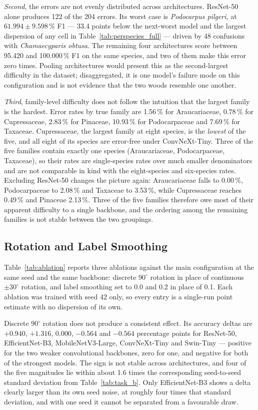 \textit{Second}, the errors are not evenly distributed across
architectures. ResNet-50 alone produces 122 of the 204 errors. Its worst
case is \textit{Podocarpus pilgeri}, at $61.994 \pm 9.598$\,\% F1 ---
33.4 points below the next-worst model and the largest dispersion of any
cell in Table~\ref{tab:perspecies_full} --- driven by 48 confusions with
\textit{Chamaecyparis obtusa}. The remaining four architectures score
between 95.420 and 100.000\,\% F1 on the same species, and two of them make
this error zero times. Pooling architectures would present this as the
second-largest difficulty in the dataset; disaggregated, it is one model's
failure mode on this configuration and is not evidence that the two woods
resemble one another.

\textit{Third}, family-level difficulty does not follow the intuition that
the largest family is the hardest. Error rates by true family are
1.56\,\% for Araucariaceae, 0.78\,\% for Cupressaceae, 2.83\,\% for
Pinaceae, 10.93\,\% for Podocarpaceae and 7.69\,\% for Taxaceae.
Cupressaceae, the largest family at eight species, is the \emph{lowest} of
the five, and all eight of its species are error-free under ConvNeXt-Tiny.
Three of the five families contain exactly one species (Araucariaceae,
Podocarpaceae, Taxaceae), so their rates are single-species rates over much
smaller denominators and are not comparable in kind with the eight-species
and six-species rates. Excluding ResNet-50 changes the picture again:
Araucariaceae falls to 0.00\,\%, Podocarpaceae to 2.08\,\% and Taxaceae to
3.53\,\%, while Cupressaceae reaches 0.49\,\% and Pinaceae 2.13\,\%. Three
of the five families therefore owe most of their apparent difficulty to a
single backbone, and the ordering among the remaining families is not stable
between the two groupings.

\subsection{Rotation and Label Smoothing}
\label{sec:results:ablation}

Table~\ref{tab:ablation} reports three ablations against the main
configuration at the same seed and the same backbone: discrete
$90^\circ$ rotation in place of continuous $\pm30^\circ$ rotation, and label
smoothing set to 0.0 and 0.2 in place of 0.1. Each ablation was trained with
seed 42 only, so every entry is a single-run point estimate with no
dispersion of its own.

Discrete $90^\circ$ rotation does not produce a consistent effect. Its
accuracy deltas are $+0.940$, $+1.316$, $0.000$, $-0.564$ and $-0.564$
percentage points for ResNet-50, EfficientNet-B3, MobileNetV3-Large,
ConvNeXt-Tiny and Swin-Tiny --- positive for the two weaker convolutional
backbones, zero for one, and negative for both of the strongest models. The
sign is not stable across architectures, and four of the five magnitudes lie
within about 1.6 times the corresponding seed-to-seed standard deviation
from Table~\ref{tab:task_b}. Only EfficientNet-B3 shows a delta clearly
larger than its own seed noise, at roughly four times that standard
deviation, and with one seed it cannot be separated from a favourable draw.

